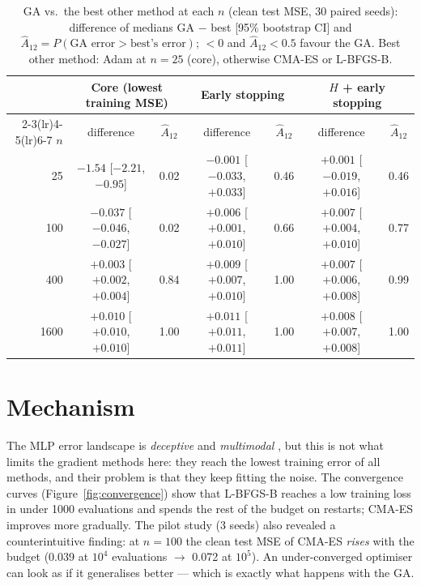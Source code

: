 \documentclass[11pt,a4paper]{article}
\newcommand{\cmaes}{CMA-ES}
\newcommand{\lbfgs}{L-BFGS-B}
\begin{document}
\begin{table}[h]
  \centering
  \caption{GA vs.\ the best other method at each $n$ (clean test MSE, 30 paired seeds): difference of medians
  GA $-$ best [95\% bootstrap CI] and $\hat{A}_{12}=P(\text{GA error}>\text{best's error})$; $<0$ and
  $\hat A_{12}<0.5$ favour the GA. Best other method: Adam at $n=25$ (core), otherwise \cmaes{} or \lbfgs.}
  \label{tab:effects}
  \footnotesize
  \begin{tabular}{@{}r cc cc cc@{}}
    \toprule
    & \multicolumn{2}{c}{Core (lowest training MSE)} & \multicolumn{2}{c}{Early stopping} & \multicolumn{2}{c}{$H$ + early stopping} \\
    \cmidrule(lr){2-3}\cmidrule(lr){4-5}\cmidrule(lr){6-7}
    $n$ & difference & $\hat A_{12}$ & difference & $\hat A_{12}$ & difference & $\hat A_{12}$ \\
    \midrule
    25   & $-1.54$ [$-2.21$, $-0.95$]      & 0.02 & $-0.001$ [$-0.033$, $+0.033$] & 0.46 & $+0.001$ [$-0.019$, $+0.016$] & 0.46 \\
    100  & $-0.037$ [$-0.046$, $-0.027$]   & 0.02 & $+0.006$ [$+0.001$, $+0.010$] & 0.66 & $+0.007$ [$+0.004$, $+0.010$] & 0.77 \\
    400  & $+0.003$ [$+0.002$, $+0.004$]   & 0.84 & $+0.009$ [$+0.007$, $+0.010$] & 1.00 & $+0.007$ [$+0.006$, $+0.008$] & 0.99 \\
    1600 & $+0.010$ [$+0.010$, $+0.010$]   & 1.00 & $+0.011$ [$+0.011$, $+0.011$] & 1.00 & $+0.008$ [$+0.007$, $+0.008$] & 1.00 \\
    \bottomrule
  \end{tabular}
\end{table}

\section{Mechanism}
\label{sec:mechanism}
The MLP error landscape is \emph{deceptive} and \emph{multimodal} \citep{yao1999evolving}, but this is not what
limits the gradient methods here: they reach the lowest training error of all methods, and their problem is that they  keep fitting the noise. The convergence curves
(Figure~\ref{fig:convergence}) show that \lbfgs{} reaches a low training loss in under 1000 evaluations and spends the rest of the budget on restarts; \cmaes{} improves more gradually. The pilot study (3 seeds) also revealed a
counterintuitive finding: at $n=100$ the clean test MSE of \cmaes{} \emph{rises} with the budget
(0.039 at $10^4$ evaluations $\to$ 0.072 at $10^5$). An under-converged optimiser can look as if it
generalises better --- which is exactly what happens with the GA.
\end{document}
